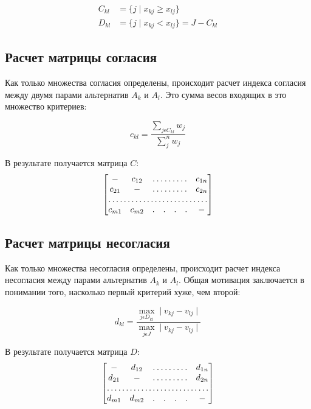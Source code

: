 \documentclass{article}
\begin{document}
        \begin{equation}
            \begin{split}
            C_{kl} &= \{j \mid x_{kj} \geq  x_{lj}\} \\
            D_{kl} &= \{j \mid x_{kj} <  x_{lj}\} = J - C_{kl}
            \end{split}
        \end{equation}

    \subsection{Расчет матрицы согласия}
        Как только множества согласия определены, происходит расчет индекса согласия между
        двумя парами альтернатив \(A_k\) и \(A_l\). Это сумма весов входящих в это
        множество критериев:

        \begin{equation}
            c_{kl} = \frac{\sum_{j \epsilon C_{kl}}w_{j}}{\sum_{j}^{n}w_{j}}
        \end{equation}

        В результате получается матрица \(C\):
        \[
            \begin{bmatrix}
                -&  c_{12}& \hdotsfor{4} & c_{1n}\\
                c_{21}&   - & \hdotsfor{4} & c_{2n}\\
                \hdotsfor{7}\\
                c_{m1}&  c_{m2}& . & . & . & . & -\\
            \end{bmatrix}
        \]

    \subsection{Расчет матрицы несогласия}
        Как только множества несогласия определены, происходит расчет индекса несогласия между
        парами альтернатив \(A_k\) и \(A_l\). Общая мотивация заключается в понимании того,
        насколько первый критерий хуже, чем второй:

        \begin{equation}
            d_{kl} = \frac
            {\max_{j \epsilon D_{kl}} \mid v_{kj} - v_{lj} \mid}
            {\max_{j \epsilon J} \mid v_{kj} - v_{lj} \mid}
        \end{equation}

        В результате получается матрица \(D\):
        \[
            \begin{bmatrix}
                -&  d_{12}& \hdotsfor{4} & d_{1n}\\
                d_{21}&   - & \hdotsfor{4} & d_{2n}\\
                \hdotsfor{7}\\
                d_{m1}&  d_{m2}& . & . & . & . & -\\
            \end{bmatrix}
        \]
\end{document}

